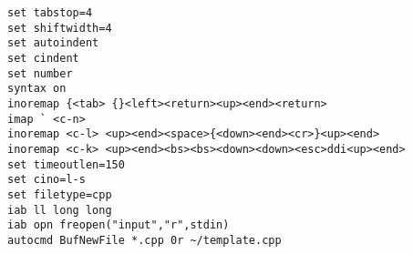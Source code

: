 \begin{verbatim}
set tabstop=4
set shiftwidth=4
set autoindent
set cindent
set number
syntax on
inoremap {<tab> {}<left><return><up><end><return>
imap ` <c-n>
inoremap <c-l> <up><end><space>{<down><end><cr>}<up><end>
inoremap <c-k> <up><end><bs><bs><down><down><esc>ddi<up><end>
set timeoutlen=150
set cino=l-s
set filetype=cpp
iab ll long long
iab opn freopen("input","r",stdin)
autocmd BufNewFile *.cpp 0r ~/template.cpp
\end{verbatim}
